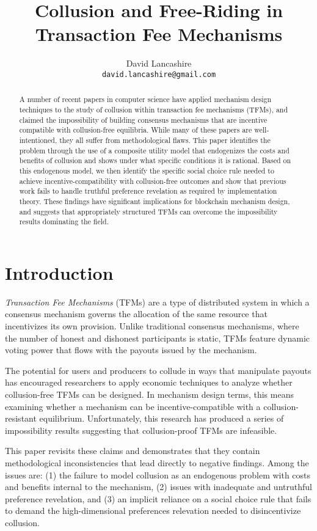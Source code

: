 \documentclass[oneside]{article}   	%
\title{Collusion and Free-Riding in Transaction Fee Mechanisms}
\author{
  David Lancashire\\
  \texttt{david.lancashire@gmail.com}\\
}
\begin{document}
\maketitle


\begin{abstract}
A number of recent papers in computer science have applied mechanism design techniques to the study of collusion within transaction fee mechanisms (TFMs), and claimed the impossibility of building consensus mechanisms that are incentive compatible with collusion-free equilibria. While many of these papers are well-intentioned, they all suffer from methodological flaws. This paper identifies the problem through the use of a composite utility model that endogenizes the costs and benefits of collusion and shows under what specific conditions it is rational. Based on this endogenous model, we then identify the specific social choice rule needed to achieve incentive-compatibility with collusion-free outcomes and show that previous work fails to handle truthful preference revelation as required by implementation theory. These findings have significant implications for blockchain mechanism design, and suggests that appropriately structured TFMs can overcome the impossibility results dominating the field.
\end{abstract}

\section{Introduction \label{sec::introduction}}

\emph{Transaction Fee Mechanisms} (TFMs) are a type of distributed system in which a consensus mechanism governs the allocation of the same resource that incentivizes its own provision. Unlike traditional consensus mechanisms, where the number of honest and dishonest participants is static, TFMs feature dynamic voting power that flows with the payouts issued by the mechanism.

The potential for users and producers to collude in ways that manipulate payouts has encouraged researchers to apply economic techniques to analyze whether collusion-free TFMs can be designed. In mechanism design terms, this means examining whether a mechanism can be incentive-compatible with a collusion-resistant equilibrium. Unfortunately, this research has produced a series of impossibility results suggesting that collusion-proof TFMs are infeasible.

This paper revisits these claims and demonstrates that they contain methodological inconsistencies that lead directly to negative findings. Among the issues are: (1) the failure to model collusion as an endogenous problem with costs and benefits internal to the mechanism, (2) issues with inadequate and untruthful preference revelation, and (3) an implicit reliance on a social choice rule that fails to demand the high-dimensional preferences relevation needed to disincentivize collusion.
\end{document}
